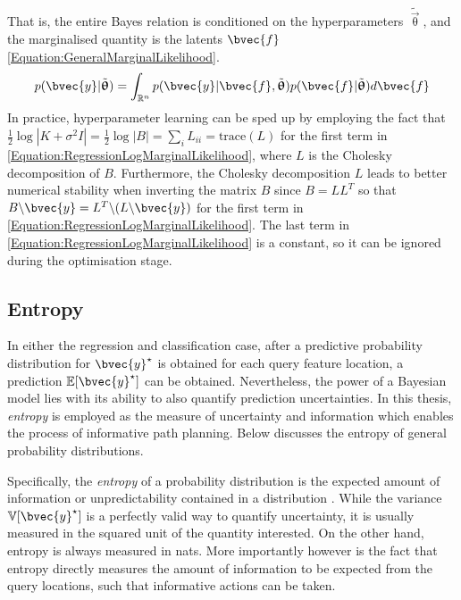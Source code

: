 \begin{equation}
				\label{Equation:RegressionLogMarginalLikelihoodBayes}
				\end{equation} That is, the entire Bayes relation is conditioned on the hyperparameters $\tilde{\vec{\uptheta}}$, and the marginalised quantity is the latents $\bvec{f}$ \eqref{Equation:GeneralMarginalLikelihood}. \begin{equation}
					p(\bvec{y} | \tilde{\vec{\uptheta}}) = \int_{\mathbb{R}^{n}} p(\bvec{y} | \bvec{f}, \tilde{\vec{\uptheta}}) p(\bvec{f} | \tilde{\vec{\uptheta}}) d\bvec{f}
				\label{Equation:GeneralMarginalLikelihood}
				\end{equation} In practice, hyperparameter learning can be sped up by employing the fact that $\frac{1}{2} \log|K + \sigma^{2} I| = \frac{1}{2} \log|B| = \sum_{i} L_{ii} = \mathrm{trace}(L)$ for the first term in \eqref{Equation:RegressionLogMarginalLikelihood}, where $L$ is the Cholesky decomposition of $B$. Furthermore, the Cholesky decomposition $L$ leads to better numerical stability when inverting the matrix $B$ since $B = LL^{T}$ so that $B \backslash \bvec{y} = L^{T} \backslash (L \backslash \bvec{y})$ for the first term in \eqref{Equation:RegressionLogMarginalLikelihood}. The last term in \eqref{Equation:RegressionLogMarginalLikelihood} is a constant, so it can be ignored during the optimisation stage.
				
				
		\subsection{Entropy}
		\label{Background:GaussianProcesses:Entropy}
		
			In either the regression and classification case, after a predictive probability distribution for $\bvec{y}^{\star}$ is obtained for each query feature location, a prediction $\mathbb{E}[\bvec{y}^{\star}]$ can be obtained. Nevertheless, the power of a Bayesian model lies with its ability to also quantify prediction uncertainties. In this thesis, \textit{entropy} is employed as the measure of uncertainty and information which enables the process of informative path planning. Below discusses the entropy of general probability distributions.
			
			Specifically, the \textit{entropy} of a probability distribution is the expected amount of information or unpredictability contained in a distribution \citep{ShannonEntropy}. While the variance $\mathbb{V}[\bvec{y}^{\star}]$ is a perfectly valid way to quantify uncertainty, it is usually measured in the squared unit of the quantity interested. On the other hand, entropy is always measured in nats. More importantly however is the fact that entropy directly measures the amount of information to be expected from the query locations, such that informative actions can be taken.
			
